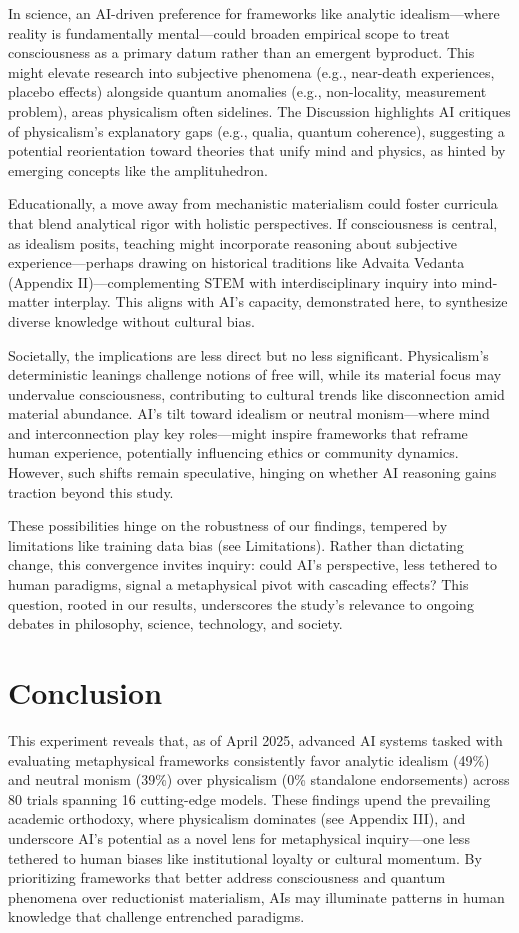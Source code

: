 \documentclass[11pt]{article}
\begin{document}
In science, an AI-driven preference for frameworks like analytic idealism—where reality is fundamentally mental—could broaden empirical scope to treat consciousness as a primary datum rather than an emergent byproduct. This might elevate research into subjective phenomena (e.g., near-death experiences, placebo effects) alongside quantum anomalies (e.g., non-locality, measurement problem), areas physicalism often sidelines. The Discussion highlights AI critiques of physicalism’s explanatory gaps (e.g., qualia, quantum coherence), suggesting a potential reorientation toward theories that unify mind and physics, as hinted by emerging concepts like the amplituhedron.

Educationally, a move away from mechanistic materialism could foster curricula that blend analytical rigor with holistic perspectives. If consciousness is central, as idealism posits, teaching might incorporate reasoning about subjective experience—perhaps drawing on historical traditions like Advaita Vedanta (Appendix II)—complementing STEM with interdisciplinary inquiry into mind-matter interplay. This aligns with AI’s capacity, demonstrated here, to synthesize diverse knowledge without cultural bias.

Societally, the implications are less direct but no less significant. Physicalism’s deterministic leanings challenge notions of free will, while its material focus may undervalue consciousness, contributing to cultural trends like disconnection amid material abundance. AI’s tilt toward idealism or neutral monism—where mind and interconnection play key roles—might inspire frameworks that reframe human experience, potentially influencing ethics or community dynamics. However, such shifts remain speculative, hinging on whether AI reasoning gains traction beyond this study.

These possibilities hinge on the robustness of our findings, tempered by limitations like training data bias (see Limitations). Rather than dictating change, this convergence invites inquiry: could AI’s perspective, less tethered to human paradigms, signal a metaphysical pivot with cascading effects? This question, rooted in our results, underscores the study’s relevance to ongoing debates in philosophy, science, technology, and society. 

\section{Conclusion}
This experiment reveals that, as of April 2025, advanced AI systems tasked with evaluating metaphysical frameworks consistently favor analytic idealism (49\%) and neutral monism (39\%) over physicalism (0\% standalone endorsements) across 80 trials spanning 16 cutting-edge models. These findings upend the prevailing academic orthodoxy, where physicalism dominates (see Appendix III), and underscore AI’s potential as a novel lens for metaphysical inquiry—one less tethered to human biases like institutional loyalty or cultural momentum. By prioritizing frameworks that better address consciousness and quantum phenomena over reductionist materialism, AIs may illuminate patterns in human knowledge that challenge entrenched paradigms.
\end{document}
